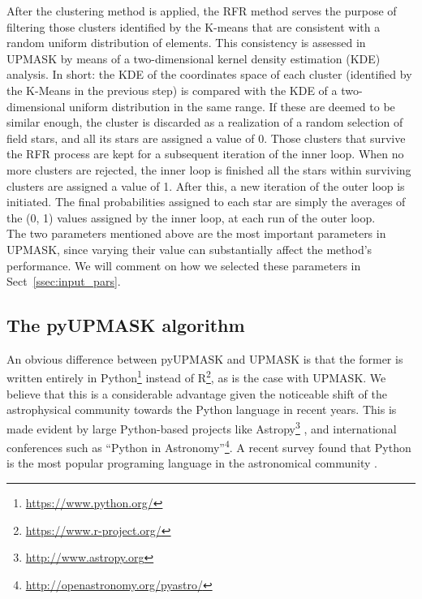 \documentclass{aa}
\begin{document}
 After the clustering method is applied, the RFR method serves the purpose of
 filtering those clusters identified by the K-means that are consistent
 with a random uniform distribution of elements. This consistency is assessed
 in UPMASK by means of a two-dimensional kernel density estimation (KDE)
 analysis. In short: the KDE of the coordinates space of each cluster 
 (identified by the K-Means in the previous step) is compared with the KDE of a
 two-dimensional uniform distribution in the same range. If these are deemed
 to be similar enough, the cluster is discarded as a realization of a random
 selection of field stars, and all its stars are assigned a value of 0. Those
 clusters that survive the RFR process are kept for a subsequent iteration of
 the inner loop. When no more clusters are rejected, the inner loop is finished
 all the stars within surviving clusters are assigned a value of 1. After this,
 a new iteration of the outer loop is initiated.
 The final probabilities assigned to each star are simply the averages of the
 (0, 1) values assigned by the inner loop, at each run of the outer loop.\\

 The two parameters mentioned above are the most important parameters in
 UPMASK, since varying their value can substantially affect the
 method's performance. We will comment on how we selected these
 parameters in Sect~\ref{ssec:input_pars}.



\subsection{The pyUPMASK algorithm}
 \label{ssec:pyupmask}

  An obvious difference between pyUPMASK and UPMASK is that the former is
  written entirely in Python\footnote{\url{https://www.python.org/}} instead
  of R\footnote{\url{https://www.r-project.org/}}, as is the case with UPMASK.
  We believe that this is a considerable advantage given the noticeable shift
  of the astrophysical community towards the Python language in recent years.
  This is made evident by large Python-based projects like
  Astropy\footnote{\url{http://www.astropy.org}} \citep{astropy:2013,
  astropy:2018},
  and international conferences such as ``Python in
  Astronomy''\footnote{\url{http://openastronomy.org/pyastro/}}. A recent
  survey found that Python is the most popular programing language in the
  astronomical community \citep{Momcheva2015,Tollerud2019SustainingCS}.
\end{document}
